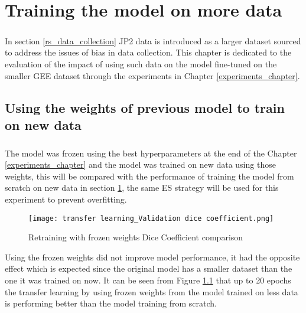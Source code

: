 \chapter{Training the model on more data} \label{new_data_train}
\paragraph{}
In section \ref{rs_data_collection} JP2 data is introduced as a larger dataset sourced to address the issues of bias in data collection. This chapter is dedicated to the evaluation of the impact of using such data on the model fine-tuned on the smaller GEE dataset through the experiments in Chapter \ref{experiments_chapter}.

\section{Using the weights of previous model to train on new data}
\paragraph{}
The model was frozen using the best hyperparameters at the end of the Chapter \ref{experiments_chapter} and the model was trained on new data using those weights, this will be compared with the performance of training the model from scratch on new data in section \ref{new_data_train}, the same ES strategy will be used for this experiment to prevent overfitting.

\begin{figure}[hbt!]
    \centering
    \texttt{[image: transfer learning\_Validation dice coefficient.png]}
    \caption{Retraining with frozen weights Dice Coefficient comparison}
    \label{rt_dice}
\end{figure}

Using the frozen weights did not improve model performance, it had the opposite effect which is expected since the original model has a smaller dataset than the one it was trained on now. It can be seen from Figure \ref{rt_dice} that up to 20 epochs the transfer learning by using frozen weights from the model trained on less data is performing better than the model training from scratch. 

